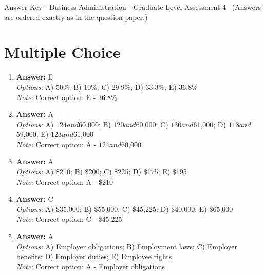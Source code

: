 \documentclass[12pt]{article}
\begin{document}
\begin{center}
Answer Key - Business Administration - Graduate Level Assessment 4 \
\small (Answers are ordered exactly as in the question paper.)
\end{center}

\section*{Multiple Choice}
\begin{enumerate}[label=\arabic*.]
\item \textbf{Answer:} E
\\ \textit{Options:} A) 50\%; B) 10\%; C) 29.9\%; D) 33.3\%; E) 36.8\%
\\ \textit{Note:} Correct option: E - 36.8\%
\item \textbf{Answer:} A
\\ \textit{Options:} A) $124 and $60,000; B) $120 and $60,000; C) $130 and $61,000; D) $118 and $59,000; E) $123 and $61,000
\\ \textit{Note:} Correct option: A - $124 and $60,000
\item \textbf{Answer:} A
\\ \textit{Options:} A) \$210; B) \$200; C) \$225; D) \$175; E) \$195
\\ \textit{Note:} Correct option: A - \$210
\item \textbf{Answer:} C
\\ \textit{Options:} A) \$35,000; B) \$55,000; C) \$45,225; D) \$40,000; E) \$65,000
\\ \textit{Note:} Correct option: C - \$45,225
\item \textbf{Answer:} A
\\ \textit{Options:} A) Employer obligations; B) Employment laws; C) Employer benefits; D) Employer duties; E) Employee rights
\\ \textit{Note:} Correct option: A - Employer obligations
\end{enumerate}
\end{document}
